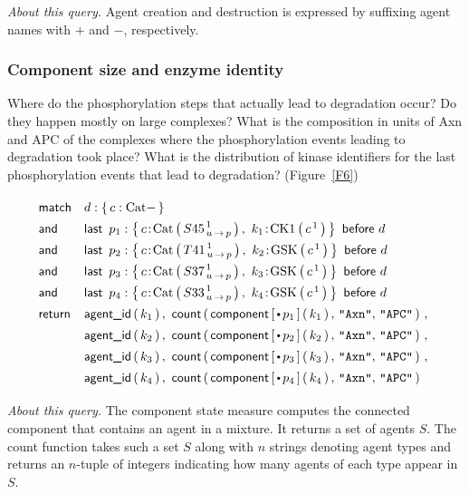 \noindent \textit{About this query.} Agent creation and destruction is
expressed by suffixing agent names with $+$ and $-$,
respectively.


\subsubsection*{Component size and enzyme identity} 
Where do the phosphorylation steps that actually lead to degradation
occur? Do they happen mostly on large complexes? What is
the composition in units of Axn and APC of the complexes where the
phosphorylation events leading to degradation took place? What is the distribution of kinase identifiers for the last phosphorylation events that lead to degradation? (Figure~\ref{F6})

\newcommand{\BigHectorStoryLine}[4]{
\LastBefore{#1:\Set{ 
          \iAG{c}{\BetaCat}{ {#2}^{\,1}_{\Trans{u}{p}}}, \ 
          \iAG{#3}{#4}{c^{\,1}}
    }}{d}
}
\newcommand{\BigHectorStoryRet}[2]{
\AgentId{#2}, \ \Count{ \Component{\StateBefore{#1}}{#2}, \, 
      \STR{Axn}, \, \STR{APC} }
}


\begin{small}
\begin{equation}\label{query:cat-deg}
  \Query{
    \m{match} & d:\Set{ c:\BetaCat - } \\
    \m{and} & \BigHectorStoryLine{p_1}{S45}{k_1}{\CKOne} \\
    \m{and} & \BigHectorStoryLine{p_2}{T41}{k_2}{\GSK}   \\
    \m{and} & \BigHectorStoryLine{p_3}{S37}{k_3}{\GSK}   \\
    \m{and} & \BigHectorStoryLine{p_4}{S33}{k_4}{\GSK}   \\
    \m{return} 
    & \BigHectorStoryRet{p_1}{k_1} \,,\  \\
    & \BigHectorStoryRet{p_2}{k_2} \,,\ \\
    & \BigHectorStoryRet{p_3}{k_3} \,,\  \\
    & \BigHectorStoryRet{p_4}{k_4} \\
  }
\end{equation}
\end{small}

\noindent \textit{About this query.} The \textsf{component} state
measure computes the connected component that contains an agent in a
mixture. It returns a set of agents $S$. The \textsf{count} function
takes such a set $S$ along with $n$ strings denoting agent types and
returns an $n$-tuple of integers indicating how many agents of each
type appear in $S$.
